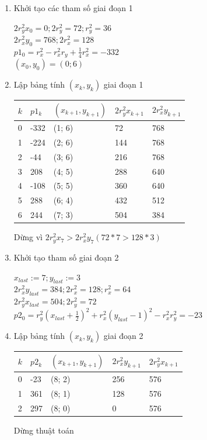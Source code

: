 \begin{enumerate}
	\item Khởi tạo các tham số giai đoạn 1
	
	$2r_y^2x_0 = 0; 2r_y^2 = 72; r_y^2 = 36$\\
	$2r_x^2y_0 = 768; 2r_x^2 = 128$\\
	$p1_0 = r_x^2 - r_x^2r_y + \frac{1}{4}r_x^2 = -332$\\
	$(x_0, y_0) = (0; 6)$
	
	\item Lập bảng tính $(x_k, y_k)$ giai đoạn 1
	
	\begin{table}[H]
		\centering
		\begin{tabular}{|l|l|l|l|l|}
			\hline
			$k$ & $p1_k$ & $(x_{k + 1}, y_{k + 1})$ & $2 r_y^2 x_{k + 1}$ & $2 r_x^2 y_{k + 1}$ \\ \hline
			0 & -332 & (1; 6) & 72 & 768 \\ \hline
			1 & -224 & (2; 6) & 144 & 768 \\ \hline
			2 & -44 & (3; 6) & 216 & 768 \\ \hline
			3 & 208 & (4; 5) & 288 & 640 \\ \hline
			4 & -108 & (5; 5) & 360 & 640 \\ \hline
			5 & 288 & (6; 4) & 432 & 512 \\ \hline
			6 & 244 & (7; 3) & 504 & 384 \\ \hline
		\end{tabular}
	\end{table}
	
	Dừng vì $2r_y^2x_7 > 2r_x^2y_7 (72*7 > 128*3)$
	
	\item Khởi tạo tham số giai đoạn 2
	
	$x_{last}:=7; y_{last}:=3$\\
	$2r_x^2y_{last} = 384; 2r_x^2 = 128; r_x^2=64$\\
	$2r_y^2x_{last} = 504; 2r_y^2 = 72$\\
	$p2_0 = r_y^2(x_{last}+\frac{1}{2})^2 + r_x^2(y_{last}-1)^2 - r_x^2r_y^2 = -23$
	
	\item Lập bảng tính $(x_k, y_k)$ giai đoạn 2
	
	\begin{table}[H]
		\centering
		\begin{tabular}{|l|l|l|l|l|}
			\hline
			$k$ & $p2_k$ & $(x_{k + 1}, y_{k + 1})$ & $2 r_x^2 y_{k + 1}$ & $2 r_y^2 x_{k + 1}$ \\ \hline
			0 & -23 & (8; 2) & 256 & 576 \\ \hline
			1 & 361 & (8; 1) & 128 & 576 \\ \hline
			2 & 297 & (8; 0) & 0 & 576 \\ \hline
		\end{tabular}
	\end{table}
	
	Dừng thuật toán
\end{enumerate}

